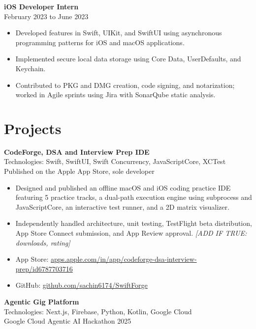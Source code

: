 \documentclass[letterpaper,11pt]{article}
\begin{document}
\vspace{4pt}
\textbf{iOS Developer Intern} \\
February 2023 to June 2023

\begin{itemize}
  \item Developed features in Swift, UIKit, and SwiftUI using asynchronous programming patterns
        for iOS and macOS applications.
  \item Implemented secure local data storage using Core Data, UserDefaults, and Keychain.
  \item Contributed to PKG and DMG creation, code signing, and notarization; worked in Agile
        sprints using Jira with SonarQube static analysis.
\end{itemize}

\section*{Projects}

\textbf{CodeForge, DSA and Interview Prep IDE} \\
Technologies: Swift, SwiftUI, Swift Concurrency, JavaScriptCore, XCTest \\
Published on the Apple App Store, sole developer

\begin{itemize}
  \item Designed and published an offline macOS and iOS coding practice IDE featuring 5 practice
        tracks, a dual-path execution engine using subprocess and JavaScriptCore, an interactive
        test runner, and a 2D matrix visualizer.
  \item Independently handled architecture, unit testing, TestFlight beta distribution, App Store
        Connect submission, and App Review approval. \textit{[ADD IF TRUE: downloads, rating]}
  \item App Store: \href{https://apps.apple.com/in/app/codeforge-dsa-interview-prep/id6787703716}{apps.apple.com/in/app/codeforge-dsa-interview-prep/id6787703716}
  \item GitHub: \href{https://github.com/sachin6174/SwiftForge}{github.com/sachin6174/SwiftForge}
\end{itemize}

\vspace{4pt}
\textbf{Agentic Gig Platform} \\
Technologies: Next.js, Firebase, Python, Kotlin, Google Cloud \\
Google Cloud Agentic AI Hackathon 2025
\end{document}
